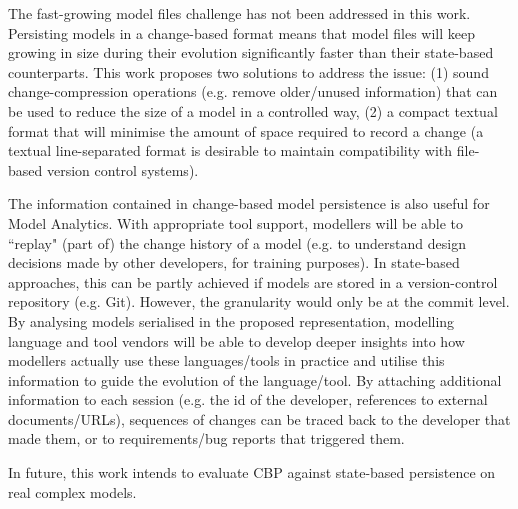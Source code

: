 The fast-growing model files challenge has not been addressed in this work. Persisting models in a change-based format means that model files will keep growing in size during their evolution significantly faster than their state-based counterparts. This work proposes two solutions to address the issue: (1) sound change-compression operations (e.g. remove older/unused information) that can be used to reduce the size of a model in a controlled way, (2) a compact textual format that will minimise the amount of space required to record a change (a textual line-separated format is desirable to maintain compatibility with file-based version control systems). 

The information contained in change-based model persistence is also useful for Model Analytics. With appropriate tool support, modellers will be able to ``replay" (part of) the change history of a model (e.g. to understand design decisions made by other developers, for training purposes). In state-based approaches, this can be partly achieved if models are stored in a version-control repository (e.g. Git). However, the granularity would only be at the commit level. By analysing models serialised in the proposed representation, modelling language and tool vendors will be able to develop deeper insights into how modellers actually use these languages/tools in practice and utilise this information to guide the evolution of the language/tool. By attaching additional information to each session (e.g. the id of the developer, references to external documents/URLs), sequences of changes can be traced back to the developer that made them, or to requirements/bug reports that triggered them.

In future, this work intends to evaluate CBP against state-based persistence on real complex models.

